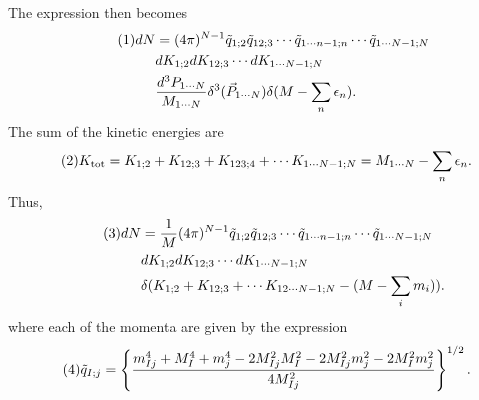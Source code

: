 \documentclass[11pt]{article}
\newcommand\eqnumber{\addtocounter{equation}{1}\tag{\theequation}}
\begin{document}
The expression then becomes
\begin{align*}\eqnumber
dN&=(4\pi)^{N-1}\tilde{q}_{1;2}\tilde{q}_{12;3}\cdots \tilde{q}_{1\cdots n-1;n}\cdots \tilde{q}_{1\cdots N-1;N}\\
&dK_{1;2}dK_{12;3}\cdots dK_{1\cdots N-1;N}\\
&\frac{d^3P_{1\cdots N}}{M_{1\cdots N}}\delta^3(\vec{P}_{1\cdots N})\delta(M-\sum_n\epsilon_n).
\end{align*}
The sum of the kinetic energies are
\begin{align*}\eqnumber
K_{\rm tot}=K_{1;2}+K_{12;3}+K_{123;4}+\cdots K_{1\cdots N-1;N}&=M_{1\cdots N}-\sum_n\epsilon_n.
\end{align*}
Thus, 
\begin{align*}\eqnumber
dN&=\frac{1}{M}(4\pi)^{N-1}\tilde{q}_{1;2}\tilde{q}_{12;3}\cdots \tilde{q}_{1\cdots n-1;n}\cdots \tilde{q}_{1\cdots N-1;N}\\
&dK_{1;2}dK_{12;3}\cdots dK_{1\cdots N-1;N}\\
&\delta(K_{1;2}+K_{12;3}+\cdots K_{12\cdots N-1;N}-(M-\sum_im_i)).
\end{align*}
where each of the momenta are given by the expression
\begin{align*}\eqnumber
\tilde{q}_{I;j}&=\left\{\frac{m_{Ij}^4+M_I^4+m_j^4-2M_{Ij}^2M_I^2-2M_{Ij}^2m_j^2-2M_I^2m_j^2}{4M_{Ij}^2}\right\}^{1/2}.
\end{align*}
\end{document}

